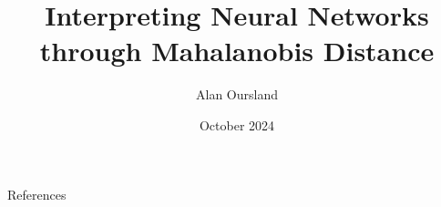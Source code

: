 \documentclass[11pt]{article}
\title{Interpreting Neural Networks through Mahalanobis Distance}
\author{Alan Oursland}
\affil{Independent Researcher}
\date{October 2024}
\begin{document}
\maketitle

\begin{abstract}
% 
\end{abstract}
 







References


\end{document}
